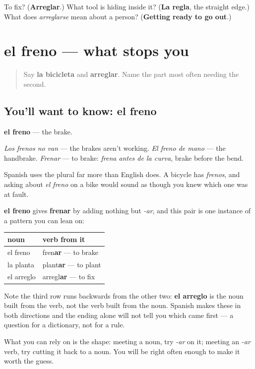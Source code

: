 \begin{tcolorbox}[breakable,colback=teal!4,colframe=teal!35!black,title={Before you move on}]
To fix? (\textbf{Arreglar}.) What tool is hiding inside it? (\textbf{La regla}, the straight edge.) What does \emph{arreglarse} mean about a person? (\textbf{Getting ready to go out}.)
\end{tcolorbox}
\section[el freno]{el freno — what stops you}

\label{lesson:ES-C449-freno}



\begin{quote}
Say \textbf{la bicicleta} and \textbf{arreglar}. Name the part most often needing the second.
\end{quote}

\subsection*{You'll want to know: el freno}
\textbf{el freno} — the brake.

\emph{Los frenos no van} — the brakes aren't working. \emph{El freno de mano} — the handbrake. \emph{Frenar} — to brake: \emph{frena antes de la curva}, brake before the bend.

Spanish uses the plural far more than English does. A bicycle has \emph{frenos}, and asking about \emph{el freno} on a bike would sound as though you knew which one was at fault.

\begin{grammarlens}[title={Grammar Lens: the noun and the verb in one step}]
\textbf{el freno} gives \textbf{frenar} by adding nothing but \emph{-ar}, and this pair is one instance of a pattern you can lean on:

\noindent
\begin{tabularx}{\linewidth}{@{}>{\raggedright\arraybackslash}X>{\raggedright\arraybackslash}X@{}}
\toprule
\textbf{noun} & \textbf{verb from it} \\
\midrule
el freno & fren\textbf{ar} — to brake \\
la planta & plant\textbf{ar} — to plant \\
el arreglo & arregl\textbf{ar} — to fix \\
\bottomrule
\end{tabularx}

Note the third row runs backwards from the other two: \textbf{el arreglo} is the noun built from the verb, not the verb built from the noun. Spanish makes these in both directions and the ending alone will not tell you which came first — a question for a dictionary, not for a rule.

What you can rely on is the shape: meeting a noun, try \emph{-ar} on it; meeting an \emph{-ar} verb, try cutting it back to a noun. You will be right often enough to make it worth the guess.
\end{grammarlens}

